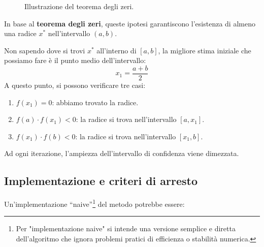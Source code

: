 \begin{figure}[ht!]
    \centering
    \caption{Illustrazione del teorema degli zeri.}
    \label{fig:teorema_zeri}
\end{figure}

In base al \textbf{teorema degli zeri}, queste ipotesi garantiscono l'esistenza di almeno una radice $x^*$ nell'intervallo $(a,b)$.

Non sapendo dove si trovi $x^*$ all'interno di $[a,b]$, la migliore stima iniziale che possiamo fare è il punto medio dell'intervallo:
\[
x_1 = \frac{a+b}{2}
\]
A questo punto, si possono verificare tre casi:
\begin{enumerate}
    \item $f(x_1) = 0$: abbiamo trovato la radice.
    \item $f(a) \cdot f(x_1) < 0$: la radice si trova nell'intervallo $[a, x_1]$.
    \item $f(x_1) \cdot f(b) < 0$: la radice si trova nell'intervallo $[x_1, b]$.
\end{enumerate}
Ad ogni iterazione, l'ampiezza dell'intervallo di confidenza viene dimezzata.

\subsection{Implementazione e criteri di arresto}
Un'implementazione ``naive''\footnote{Per "implementazione naive" si intende una versione semplice e diretta dell'algoritmo che ignora problemi pratici di efficienza o stabilità numerica.} del metodo potrebbe essere:


